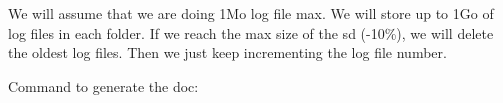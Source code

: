 We will assume that we are doing 1Mo log file max. We will store up to 1Go of log files in each folder. If we reach the max size of the sd (-\/10\%), we will delete the oldest log files. Then we just keep incrementing the log file number.

Command to generate the doc\+: 
\begin{DoxyCode}{0}

\end{DoxyCode}
 